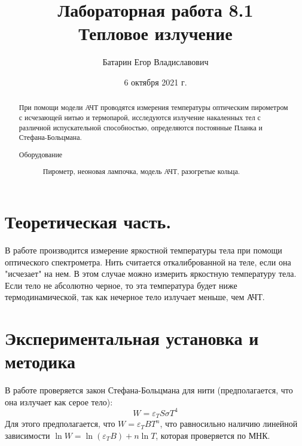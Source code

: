 \documentclass[%
 reprint,
 amsmath,amssymb,
 aps,
]{revtex4-2}
\begin{document}
\title{Лабораторная работа 8.1\\Тепловое излучение}%



\author{Батарин Егор Владиславович}
%


\date{6 октября 2021 г.}%
             

\begin{abstract}
При помощи модели АЧТ проводятся измерения температуры оптическим пирометром с исчезающей нитью и термопарой, исследуются излучение накаленных тел с различной испускательной способностью, определяются постоянные Планка и Стефана-Больцмана.
\begin{description}
\item[Оборудование]
Пирометр, неоновая лампочка, модель АЧТ, разогретые кольца.
\end{description}
\end{abstract}

\maketitle


\section{Теоретическая часть.}

В работе производится измерение яркостной температуры тела при помощи оптического спектрометра. Нить считается откалиброванной на теле, если она "исчезает" на нем. В этом случае можно измерить яркостную температуру тела. Если тело не абсолютно черное, то эта температура будет ниже термодинамической, так как нечерное тело излучает меньше, чем АЧТ. 


\section{Экспериментальная установка и методика}

В работе проверяется закон Стефана-Больцмана для нити (предполагается, что она излучает как серое тело):
$$W  = \varepsilon_T S \sigma T^4$$
Для этого предполагается, что $W = \varepsilon_T B T^n$, что равносильно наличию линейной зависимости $\ln W = \ln(\varepsilon_T B) + n\ln T$, которая проверяется по МНК.
\end{document}
